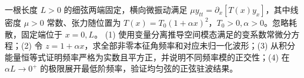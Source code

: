 一根长度 \(L>0\) 的细弦两端固定，横向微振动满足 \(\mu y_{tt}=\partial_x[T(x)y_x]\)，其中线密度 \(\mu>0\) 常数、张力随位置为 \(T(x)=T_0(1+\alpha x)^2\)，\(T_0>0,\alpha>0\)。忽略耗散，固定端位于 \(x=0,L\)。
(1) 使用变量分离推导空间模态满足的变系数常微分方程；(2) 令 \(z=1+\alpha x\)，求全部非零本征角频率和对应未归一化波形；(3) 从积分能量恒等式证明频率严格为实数且平方正，并说明不同频率模的正交性；(4) 在 \(\alpha L\to0^+\) 的极限展开最低阶频率，验证均匀弦的正弦驻波结果。
